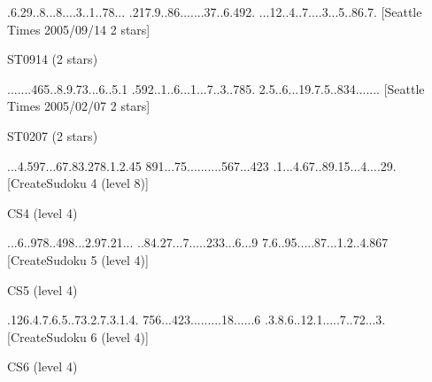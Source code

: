 \documentclass[twoside]{article}
\begin{document}
\renewcommand*{\puzzlefile}{st0914.sud}
\writepuzzle%
{.6.29..8.}{..8....3.}{.1..78...}%
{.217.9..8}{6.......3}{7..6.492.}%
{...12..4.}{.7....3..}{.5..86.7.}%
[Seattle Times 2005/09/14  2 stars]
\vfill
\begin{minipage}{0.95\linewidth}\begin{center}
ST0914 (2 stars) \\
\end{center}\end{minipage}

\renewcommand*{\puzzlefile}{st0207.sud}
\writepuzzle%
{.......46}{5..8.9.73}{...6..5.1}%
{.592..1..}{6...1...7}{..3..785.}%
{2.5..6...}{19.7.5..8}{34.......}%
[Seattle Times 2005/02/07 2 stars]
\vfill
\begin{minipage}{0.95\linewidth}\begin{center}
ST0207 (2 stars) \\
\end{center}\end{minipage}

\renewcommand*{\puzzlefile}{cs4.sud}
\writepuzzle%
{...4.597.}{..67.83.2}{78.1.2.45}%
{891...75.}{.........}{567...423}%
{.1...4.67}{..89.15..}{.4....29.}%
[CreateSudoku 4 (level 8)]
\vfill
\begin{minipage}{0.95\linewidth}\begin{center}
CS4 (level 4) \\
\end{center}\end{minipage}

\renewcommand*{\puzzlefile}{cs5.sud}
\writepuzzle%
{...6..978}{..498...2}{.97.21...}%
{..84.27..}{.7.....23}{3...6...9}%
{7.6..95..}{...87...1}{.2..4.867}%
[CreateSudoku 5 (level 4)]
\vfill
\begin{minipage}{0.95\linewidth}\begin{center}
CS5 (level 4) \\
\end{center}\end{minipage}

\renewcommand*{\puzzlefile}{cs6.sud}
\writepuzzle%
{.126.4.7.}{6.5..73.2}{.7.3.1.4.}%
{756...423}{.........}{18......6}%
{.3.8.6..1}{2.1.....7}{..72...3.}%
[CreateSudoku 6 (level 4)]
\vfill
\begin{minipage}{0.95\linewidth}\begin{center}
CS6 (level 4) \\
\end{center}\end{minipage}
\end{document}
